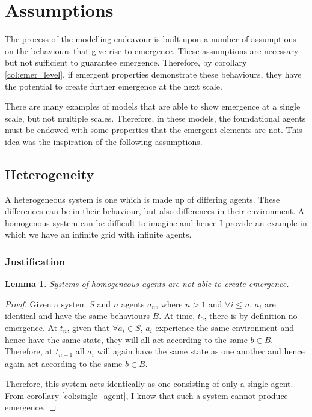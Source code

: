 \documentclass{article}
\newtheorem{lemma}[theorem]{Lemma}
\begin{document}
\section{Assumptions}

The process of the modelling endeavour is built upon a number of assumptions on the behaviours that give rise to emergence. These assumptions are necessary but not sufficient to guarantee emergence. Therefore, by corollary \ref{col:emer_level}, if emergent properties demonstrate these behaviours, they have the potential to create further emergence at the next scale.

      There are many examples of models that are able to show emergence at a single scale, but not multiple scales. Therefore, in these models, the foundational agents must be endowed with some properties that the emergent elements are not. This idea was the inspiration of the following assumptions.

      
  \subsection{Heterogeneity}
  \label{sec: hetro}
  
    A heterogeneous system is one which is made up of differing agents. These differences can be in their behaviour, but also differences in their environment. A homogenous system can be difficult to imagine and hence I provide an example in which we have an infinite grid with infinite agents. 

    \subsubsection{Justification}

      \begin{lemma}
        Systems of homogeneous agents are not able to create emergence. 
      \end{lemma}
      \begin{proof}

        Given a system $S$ and $n$ agents $a_n$, where $n > 1$ and $\forall i \leq n$, $a_i$ are identical and have the same behaviours $B$. At time, $t_0$, there is by definition no emergence. At $t_n$, given that $\forall a_i \in S$, $a_i$ experience the same environment and hence have the same state, they will all act according to the same $b \in B$. Therefore, at $t_{n+1}$ all $a_i$ will again have the same state as one another and hence again act according to the same $b \in B$.

        Therefore, this system acts identically as one consisting of only a single agent. From corollary \ref{col:single_agent}, I know that such a system cannot produce emergence.

      \end{proof}
\end{document}
